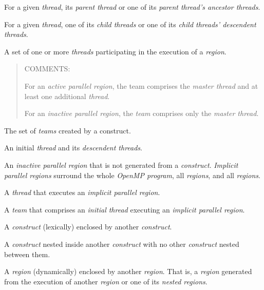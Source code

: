 \glossarydefstart
For a given \emph{thread}, its \emph{parent thread} or one of its \emph{parent thread's ancestor threads}.
\glossarydefend

\glossarydefstart
For a given \emph{thread}, one of its \emph{child threads} or one of
its \emph{child threads' descendent threads}.
\glossarydefend

\glossarydefstart
A set of one or more \emph{threads} participating in the execution of a 
\emph{region}.

\begin{quote}
COMMENTS:

For an \emph{active parallel region}, the team comprises the \emph{master thread}
and at least one additional \emph{thread}.

For an \emph{inactive parallel region}, the \emph{team} comprises only the \emph{master thread}.
\end{quote}
\glossarydefend

\glossarydefstart
The set of \emph{teams} created by a  construct.
\glossarydefend

\glossarydefstart
An initial \emph{thread} and its \emph{descendent threads}.
\glossarydefend

\glossarydefstart
An \emph{inactive parallel region} that is not generated from a
 \emph{construct}. \emph{Implicit parallel regions} surround the whole
\emph{OpenMP program}, all  \emph{regions}, and all 
\emph{regions}.

\glossarydefend

\glossarydefstart
A \emph{thread} that executes an \emph{implicit parallel region}.
\glossarydefend

\glossarydefstart
A \emph{team} that comprises an \emph{initial thread} executing an \emph{implicit parallel region}.
\glossarydefend

\glossarydefstart
A \emph{construct} (lexically) enclosed by another \emph{construct}.
\glossarydefend

\glossarydefstart
A \emph{construct} nested inside another \emph{construct} with no other \emph{construct} nested
between them.
\glossarydefend

\glossarydefstart
A \emph{region} (dynamically) enclosed by another \emph{region}.  That is, a
\emph{region} generated from the execution of another \emph{region}
or one of its \emph{nested regions}.

